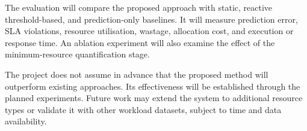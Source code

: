 \documentclass[12pt,a4paper]{report}
\begin{document}
The evaluation will compare the proposed approach with static, reactive threshold-based, and prediction-only baselines. It will measure prediction error, SLA violations, resource utilisation, wastage, allocation cost, and execution or response time. An ablation experiment will also examine the effect of the minimum-resource quantification stage.

The project does not assume in advance that the proposed method will outperform existing approaches. Its effectiveness will be established through the planned experiments. Future work may extend the system to additional resource types or validate it with other workload datasets, subject to time and data availability.
\lipsum[106-115]
\end{document}
